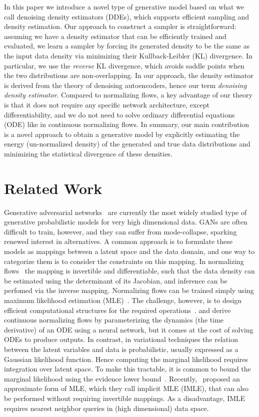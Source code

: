 \documentclass{article}
\begin{document}
In this paper we introduce a novel type of generative model based on what we call denoising density estimators (DDEs), which supports efficient sampling and density estimation. Our approach to construct a sampler is straightforward: assuming we have a density estimator that can be efficiently trained and evaluated, we learn a sampler by forcing its generated density to be the same as the input data density via minimizing their Kullback-Leibler (KL) divergence. In particular, we use the {\em reverse} KL divergence, which avoids saddle points when the two distributions are non-overlapping. In our approach, the density estimator is derived from the theory of denoising autoencoders, hence our term {\em denoising density estimator}. Compared to normalizing flows, a key advantage of our theory is that it does not require any specific network architecture, except differentiability, and we do not need to solve ordinary differential equations (ODE) like in continuous normalizing flows. In summary, our main contribution is a novel approach to obtain a generative model by explicitly estimating the energy (un-normalized density) of the generated and true data distributions and minimizing the statistical divergence of these densities. 

\section{Related Work}
Generative adversarial networks~\citep{Goodfellow2014GAN} are currently the most widely studied type of generative probabilistic models for very high dimensional data.
GANs are often difficult to train, however, and they can suffer from mode-collapse, sparking renewed interest in alternatives. A common approach is to formulate these models as mappings between a latent space and the data domain, and one way to categorize them is to consider the constraints on this mapping. In normalizing flows~\citep{Dinh2014NICE,Rezend2015NFl} the mapping is invertible and differentiable, such that the data density can be estimated using the determinant of its Jacobian, and inference can be perfomed via the inverse mapping. Normalizing flows can be trained simply using maximum likelihood estimation (MLE)~\citep{Dinh2017NVP}. The challenge, however, is to design efficient computational structures for the required operations~\citep{Huang2018NAF,Kingma2018GLOW}. \citet{Chen2018NODE} and \citet{grathwohl2019ffjord} derive continuous normalizing flows by parameterizing the dynamics (the time derivative) of an ODE using a neural network,
but it comes at the cost of solving ODEs to produce outputs.
In contrast, in variational techniques the relation between the latent variables and data is probabilistic, usually expressed as a Gaussian likelihood function. Hence computing the marginal likelihood requires integration over latent space. To make this tractable, it is common to bound the marginal likelihood using the evidence lower bound~\citep{Kingma2014VAE}. 
Recently,~\citet{Li2018IMLE} proposed an approximate form of MLE, which they call implicit MLE (IMLE), that can also be performed without requiring invertible mappings. As a disadvantage, IMLE requires nearest neighbor queries in (high dimensional) data space.
\end{document}
